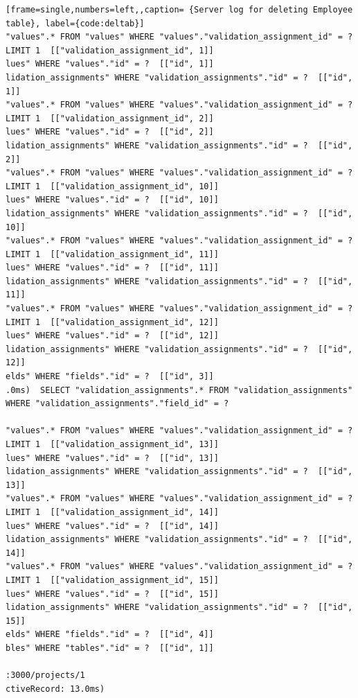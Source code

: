 \documentclass[a4paper,12pt]{article}
\begin{document}
\begin{lstlisting}[frame=single,numbers=left,,caption= {Server log for deleting Employee table}, label={code:deltab}]
"values".* FROM "values" WHERE "values"."validation_assignment_id" = ? LIMIT 1  [["validation_assignment_id", 1]]
lues" WHERE "values"."id" = ?  [["id", 1]]
lidation_assignments" WHERE "validation_assignments"."id" = ?  [["id", 1]]
"values".* FROM "values" WHERE "values"."validation_assignment_id" = ? LIMIT 1  [["validation_assignment_id", 2]]
lues" WHERE "values"."id" = ?  [["id", 2]]
lidation_assignments" WHERE "validation_assignments"."id" = ?  [["id", 2]]
"values".* FROM "values" WHERE "values"."validation_assignment_id" = ? LIMIT 1  [["validation_assignment_id", 10]]
lues" WHERE "values"."id" = ?  [["id", 10]]
lidation_assignments" WHERE "validation_assignments"."id" = ?  [["id", 10]]
"values".* FROM "values" WHERE "values"."validation_assignment_id" = ? LIMIT 1  [["validation_assignment_id", 11]]
lues" WHERE "values"."id" = ?  [["id", 11]]
lidation_assignments" WHERE "validation_assignments"."id" = ?  [["id", 11]]
"values".* FROM "values" WHERE "values"."validation_assignment_id" = ? LIMIT 1  [["validation_assignment_id", 12]]
lues" WHERE "values"."id" = ?  [["id", 12]]
lidation_assignments" WHERE "validation_assignments"."id" = ?  [["id", 12]]
elds" WHERE "fields"."id" = ?  [["id", 3]]
.0ms)  SELECT "validation_assignments".* FROM "validation_assignments" WHERE "validation_assignments"."field_id" = ?

"values".* FROM "values" WHERE "values"."validation_assignment_id" = ? LIMIT 1  [["validation_assignment_id", 13]]
lues" WHERE "values"."id" = ?  [["id", 13]]
lidation_assignments" WHERE "validation_assignments"."id" = ?  [["id", 13]]
"values".* FROM "values" WHERE "values"."validation_assignment_id" = ? LIMIT 1  [["validation_assignment_id", 14]]
lues" WHERE "values"."id" = ?  [["id", 14]]
lidation_assignments" WHERE "validation_assignments"."id" = ?  [["id", 14]]
"values".* FROM "values" WHERE "values"."validation_assignment_id" = ? LIMIT 1  [["validation_assignment_id", 15]]
lues" WHERE "values"."id" = ?  [["id", 15]]
lidation_assignments" WHERE "validation_assignments"."id" = ?  [["id", 15]]
elds" WHERE "fields"."id" = ?  [["id", 4]]
bles" WHERE "tables"."id" = ?  [["id", 1]]

:3000/projects/1
ctiveRecord: 13.0ms)
\end{lstlisting}
\end{document}
